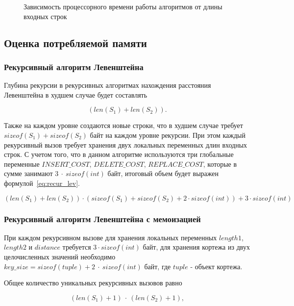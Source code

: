 \begin{figure}[!htb]
    \caption{Зависимость процессорного времени работы алгоритмов от длины входных строк}
    \label{fig:timings}
\end{figure}

\newpage

\subsection{Оценка потребляемой памяти}

\subsubsection{Рекурсивный алгоритм Левенштейна}

Глубина рекурсии в рекурсивных алгоритмах нахождения расстояния Левенштейна в худшем случае будет составлять 

\begin{equation}
    (len(S_1) + len(S_2)).
\end{equation}

Также на каждом уровне создаются новые строки, что в худшем случае требует $sizeof(S_1) + sizeof(S_2)$ байт на каждом уровне рекурсии. При этом каждый рекурсивный вызов требует хранения двух локальных переменных длин входных строк. С учетом того, что в данном алгоритме используются три глобальные переменные $INSERT\_COST$, $DELETE\_COST$, $REPLACE\_COST$, которые в сумме занимают $3~\cdot~sizeof(int)$ байт, итоговый объем будет выражен формулой~\ref{eq:recur_lev}.

\begin{equation}
    \label{eq:recur_lev}
    (len(S_1) + len(S_2)) \cdot (sizeof(S_1) + sizeof(S_2) + 2 \cdot sizeof(int)) + 3 \cdot sizeof(int)
\end{equation}

\subsubsection{Рекурсивный алгоритм Левенштейна с мемоизацией}

При каждом рекурсивном вызове для хранения локальных переменных $length1$, $length2$ и $distance$ требуется $3 \cdot sizeof(int)$ байт, для хранения кортежа из двух целочисленных значений необходимо $key\_size = sizeof(tuple) + 2~\cdot~sizeof(int)$ байт, где $tuple$ - объект кортежа. 

Общее количество уникальных рекурсивных вызовов равно 

\begin{equation}
    \label{eq:recur_calls}
    (len(S_1) + 1)~\cdot~(len(S_2) + 1),
\end{equation}

